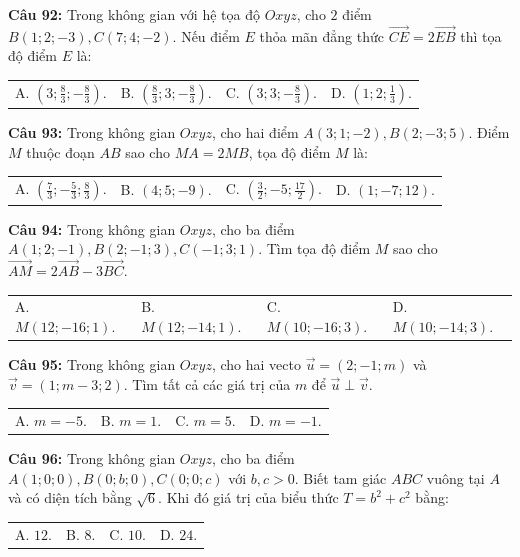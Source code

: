 \documentclass[12pt]{article}
\begin{document}
	\vspace{2mm}
	\noindent \textbf{Câu 92:} Trong không gian với hệ tọa độ $Oxyz$, cho $2$ điểm $B(1;2;-3), C(7;4;-2)$. Nếu điểm $E$ thỏa mãn đẳng thức $\vec{CE} = 2\vec{EB}$ thì tọa độ điểm $E$ là: \\
	\noindent
	\begin{tabular}{p{} p{} p{} p{}}
		A. $\left(3; \frac{8}{3}; -\frac{8}{3}\right)$. & B. $\left(\frac{8}{3}; 3; -\frac{8}{3}\right)$. & C. $\left(3; 3; -\frac{8}{3}\right)$. & D. $\left(1; 2; \frac{1}{3}\right)$.
	\end{tabular}
	
	\vspace{2mm}
	\noindent \textbf{Câu 93:} Trong không gian $Oxyz$, cho hai điểm $A(3;1;-2), B(2;-3;5)$. Điểm $M$ thuộc đoạn $AB$ sao cho $MA = 2MB$, tọa độ điểm $M$ là: \\
	\noindent
	\begin{tabular}{p{} p{} p{} p{}}
		A. $\left(\frac{7}{3}; -\frac{5}{3}; \frac{8}{3}\right)$. & B. $(4; 5; -9)$. & C. $\left(\frac{3}{2}; -5; \frac{17}{2}\right)$. & D. $(1; -7; 12)$.
	\end{tabular}
	
	\vspace{2mm}
	\noindent \textbf{Câu 94:} Trong không gian $Oxyz$, cho ba điểm $A(1; 2; -1), B(2; -1; 3), C(-1; 3; 1)$. Tìm tọa độ điểm $M$ sao cho $\vec{AM} = 2\vec{AB} - 3\vec{BC}$. \\
	\noindent
	\begin{tabular}{p{} p{} p{} p{}}
		A. $M(12; -16; 1)$. & B. $M(12; -14; 1)$. & C. $M(10; -16; 3)$. & D. $M(10; -14; 3)$.
	\end{tabular}
	
	\vspace{2mm}
	\noindent \textbf{Câu 95:} Trong không gian $Oxyz$, cho hai vecto $\vec{u} = (2; -1; m)$ và $\vec{v} = (1; m-3; 2)$. Tìm tất cả các giá trị của $m$ để $\vec{u} \perp \vec{v}$. \\
	\noindent
	\begin{tabular}{p{} p{} p{} p{}}
		A. $m = -5$. & B. $m = 1$. & C. $m = 5$. & D. $m = -1$.
	\end{tabular}
	
	\vspace{2mm}
	\noindent \textbf{Câu 96:} Trong không gian $Oxyz$, cho ba điểm $A(1; 0; 0), B(0; b; 0), C(0; 0; c)$ với $b, c > 0$. Biết tam giác $ABC$ vuông tại $A$ và có diện tích bằng $\sqrt{6}$. Khi đó giá trị của biểu thức $T = b^2 + c^2$ bằng: \\
	\noindent
	\begin{tabular}{p{} p{} p{} p{}}
		A. $12$. & B. $8$. & C. $10$. & D. $24$.
	\end{tabular}
	
\end{document}
